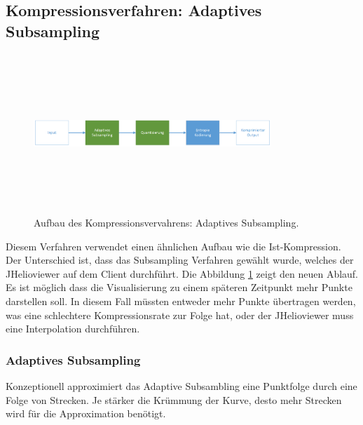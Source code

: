 \subsection{Kompressionsverfahren: Adaptives Subsampling} \label{konzept:loesung0}
\begin{figure}[!htbp]
	\center
	\includegraphics[width=0.8\textwidth,height=6cm,keepaspectratio]{./pictures/konzept/solution0/aufbau.png}
	\caption{Aufbau des Kompressionsvervahrens: Adaptives Subsampling.}
	\label{konzept:loesung0:aufbau:diagramm}
\end{figure} 
Diesem Verfahren verwendet einen ähnlichen Aufbau wie die Ist-Kompression. Der Unterschied ist, dass das Subsampling Verfahren gewählt wurde, welches der JHelioviewer auf dem Client durchführt. Die Abbildung \ref{konzept:loesung0:aufbau:diagramm} zeigt den neuen Ablauf.\\
Es ist möglich dass die Visualisierung zu einem späteren Zeitpunkt mehr Punkte darstellen soll. In diesem Fall müssten entweder mehr Punkte übertragen werden, was eine schlechtere Kompressionsrate zur Folge hat, oder der JHelioviewer muss eine Interpolation durchführen. 

\subsubsection{Adaptives Subsampling}\label{konzept:loesung0:subsampling}
Konzeptionell approximiert das Adaptive Subsambling eine Punktfolge durch eine Folge von Strecken. Je stärker die Krümmung der Kurve, desto mehr Strecken wird für die Approximation benötigt.

